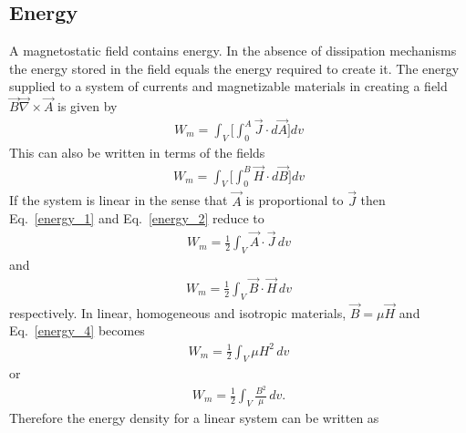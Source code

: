 \documentclass[11pt,a4paper,oneside]{book}
\numberwithin{equation}{section}
\theoremstyle{it}
\theoremstyle{definition}
\begin{document}
\subsection{Energy}
A magnetostatic field contains energy. In the absence of dissipation mechanisms the energy stored in the field equals the energy required to create it. The energy supplied to a system of currents and magnetizable materials in creating a field $\vec{B}\vec{\nabla}\times\vec{A}$ is given by
\begin{equation}\label{energy_1}
	\begin{aligned}
		W_m = \int_{V}\Bigg[\int_{0}^{A}\vec{J}\cdot d\vec{A}\Bigg]dv
	\end{aligned}
\end{equation}  
This can also be written in terms of the fields
\begin{equation}\label{energy_2}
	\begin{aligned}
		W_m = \int_{V}\Bigg[\int_{0}^{B}\vec{H}\cdot d\vec{B}\Bigg]dv
	\end{aligned}
\end{equation}  
If the system is linear in the sense that $\vec{A}$ is proportional to $\vec{J}$ then Eq.~\eqref{energy_1} and Eq.~\eqref{energy_2} reduce to 
\begin{equation}\label{energy_3}
\boxed{	\begin{aligned}
		W_m = \frac{1}{2}\int_{V}\vec{A}\cdot \vec{J}\,dv
	\end{aligned}}
\end{equation}  
and
\begin{equation}\label{energy_4}
\boxed{	\begin{aligned}
		W_m = \frac{1}{2}\int_{V}\vec{B}\cdot \vec{H}\,dv
	\end{aligned}}
\end{equation}   
respectively. In linear, homogeneous and isotropic materials, $\vec{B}=\mu\vec{H}$ and Eq.~\eqref{energy_4} becomes
\begin{equation}\label{energy_5}
	\begin{aligned}
		W_m = \frac{1}{2}\int_{V}\mu H^2\,dv
	\end{aligned}
\end{equation} 
or
\begin{equation}\label{energy_6}
	\begin{aligned}
		W_m = \frac{1}{2}\int_{V}\frac{B^2}{\mu}\,dv.
	\end{aligned}
\end{equation} 
Therefore the energy density for a linear system can be written as
\end{document}
